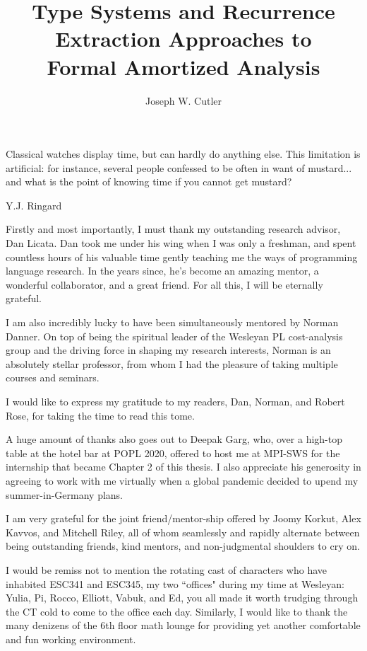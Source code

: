 \documentclass[final]{westhesis}
\title{Type Systems and Recurrence Extraction Approaches to\\ Formal Amortized Analysis}
\author{Joseph W. Cutler}
\begin{document}
\begin{abstract}
\end{abstract}


\begin{dedication}
\epigraph{Classical watches display time, but can hardly do anything else. This limitation is artificial: for instance, several people confessed to be often in want of mustard... and what is the point of knowing time if you cannot get mustard?}{Y.J. Ringard \cite{mustard-watches}}
\end{dedication}

\begin{acknowledgements}
Firstly and most importantly, I must thank my outstanding research advisor, Dan Licata. Dan took me under his wing when I was only a freshman, and spent countless hours of his valuable time gently teaching me the ways of programming language research. In the years since, he's become an amazing mentor, a wonderful collaborator, and a great friend. For all this, I will be eternally grateful.

I am also incredibly lucky to have been simultaneously mentored by Norman Danner. On top of being the spiritual leader of the Wesleyan PL cost-analysis group and the driving force in shaping my research interests, Norman is an absolutely stellar professor, from whom I had the pleasure of taking multiple courses and seminars.

I would like to express my gratitude to my readers, Dan, Norman, and Robert Rose, for taking the time to read this tome.

A huge amount of thanks also goes out to Deepak Garg, who, over a high-top table at the hotel bar at POPL 2020, offered to host me at MPI-SWS for the internship that became Chapter 2 of this thesis. I also appreciate his generosity in agreeing to work with me virtually when a global pandemic decided to upend my summer-in-Germany plans.

I am very grateful for the joint friend/mentor-ship offered by Joomy Korkut, Alex Kavvos, and Mitchell Riley, all of whom seamlessly and rapidly alternate between being outstanding friends, kind mentors, and non-judgmental shoulders to cry on.

I would be remiss not to mention the rotating cast of characters who have inhabited ESC341 and ESC345, my two ``offices" during my time at Wesleyan: Yulia, Pi, Rocco, Elliott, Vabuk, and Ed, you all made it worth trudging through the CT cold to come to the office each day. Similarly, I would like to thank the many denizens of the 6th floor math lounge for providing yet another comfortable and fun working environment.


\end{acknowledgements}
\end{document}
